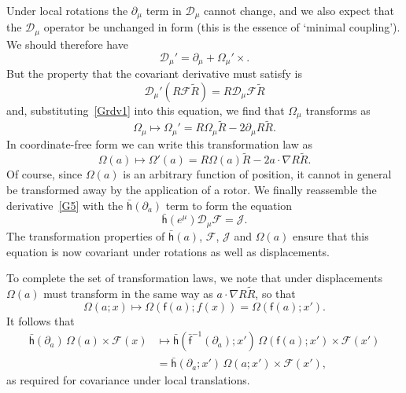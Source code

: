 \documentclass[a4paper]{article}
\numberwithin{equation}{section}
\newcommand{\nn}{\nonumber}
\newcommand{\dt}{\! \cdot \!}
\newcommand{\crs}{\! \times \!}
\newcommand{\Om}{\Omega}
\newcommand{\cld}{{\mathcal{D}}}
\newcommand{\clf}{{\mathcal{F}}}
\newcommand{\clj}{{\mathcal{J}}}
\newcommand{\da}{\partial_a}
\newcommand{\dmu}{\partial_{\mu}}
\newcommand{\Rrev}{\tilde{R}}
\newcommand{\lif}{\mathsf{f}}
\newcommand{\lbf}{\bar{\mathsf{f}}}
\newcommand{\lbh}{\bar{\mathsf{h}}}
\newcommand{\ho}{\lbh}
\newcommand{\fo}{\lbf}
\newcommand{\fu}{\lif}
\newcommand{\grad}{\nabla}
\begin{document}
Under local rotations the $\dmu$ term in $\cld_\mu$ cannot change,
and we also expect that the $\cld_\mu$ operator be unchanged in form
(this is the essence of `minimal coupling').  We should therefore have
%
\begin{equation}
\cld_\mu' =  \dmu + \Om_\mu' \times.
\label{Grdv1}
\end{equation}
%
But the property that the covariant derivative must satisfy is
%
\begin{equation}
\cld_\mu' (R\clf\Rrev) = R \cld_\mu \clf \Rrev
\end{equation}
%
and, substituting~\eqref{Grdv1} into this equation, we find that $\Om_\mu$
transforms as
%
\begin{equation}
\Om_\mu \mapsto \Om_\mu' = R \Om_\mu \Rrev - 2 \dmu R \Rrev.
\end{equation}
%
In coordinate-free form we can write this transformation law as
%
\begin{equation}
\Om(a) \mapsto \Om'(a) = R \Om(a) \Rrev - 2 a \dt \grad R \Rrev.
\label{G6}
\end{equation} 
%
Of course, since $\Om(a)$ is an arbitrary function of position, it
cannot in general be transformed away by the application of a rotor.
We finally reassemble the derivative~\eqref{G5} with the $\ho(\da)$ term
to form the equation
%
\begin{equation}
\ho(e^\mu)\cld_\mu \clf = \clj.
\end{equation}
%
The transformation properties of $\ho(a)$, $\clf$, $\clj$ and $\Om(a)$
ensure that this equation is now covariant under rotations as well as
displacements.


To complete the set of transformation laws, we note that under
displacements $\Om(a)$ must transform in the same way as $a\dt\grad
R\Rrev$, so that 
%
\begin{equation}
\Om(a;x) \mapsto \Om(\fu(a); f(x)) =  \Om(\fu(a); x').
\label{GOmtrf} 
\end{equation} 
%
It follows that
%
\begin{align}
\ho(\da) \, \Om(a) \crs \clf(x) &\mapsto \ho(\fo^{-1}(\da);x') \,
\Om(\fu(a);x') \crs \clf(x') \nn \\
&= \ho(\da;x') \,  \Om(a;x') \crs \clf(x'),
\end{align}
%
as required for covariance under local translations.
\end{document}
